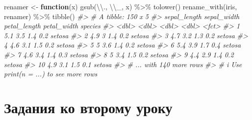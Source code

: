 \documentclass[
]{book}
\newenvironment{Shaded}{\begin{snugshade}}{\end{snugshade}}
\newcommand{\CommentTok}[1]{\textcolor[rgb]{0.56,0.35,0.01}{\textit{#1}}}
\newcommand{\ControlFlowTok}[1]{\textcolor[rgb]{0.13,0.29,0.53}{\textbf{#1}}}
\newcommand{\FunctionTok}[1]{\textcolor[rgb]{0.00,0.00,0.00}{#1}}
\newcommand{\NormalTok}[1]{#1}
\newcommand{\OtherTok}[1]{\textcolor[rgb]{0.56,0.35,0.01}{#1}}
\newcommand{\SpecialCharTok}[1]{\textcolor[rgb]{0.00,0.00,0.00}{#1}}
\newcommand{\StringTok}[1]{\textcolor[rgb]{0.31,0.60,0.02}{#1}}
\begin{document}
\begin{Shaded}
\begin{Highlighting}[]
\NormalTok{renamer }\OtherTok{\textless{}{-}} \ControlFlowTok{function}\NormalTok{(x) }\FunctionTok{gsub}\NormalTok{(}\StringTok{\textquotesingle{}}\SpecialCharTok{\textbackslash{}\textbackslash{}}\StringTok{.\textquotesingle{}}\NormalTok{, }\StringTok{\textquotesingle{}}\SpecialCharTok{\textbackslash{}\textbackslash{}}\StringTok{\_\textquotesingle{}}\NormalTok{, x) }\SpecialCharTok{\%\textgreater{}\%} \FunctionTok{tolower}\NormalTok{()}
\FunctionTok{rename\_with}\NormalTok{(iris, renamer) }\SpecialCharTok{\%\textgreater{}\%} 
  \FunctionTok{tibble}\NormalTok{()}
\CommentTok{\#\textgreater{} \# A tibble: 150 x 5}
\CommentTok{\#\textgreater{}    sepal\_length sepal\_width petal\_length petal\_width species}
\CommentTok{\#\textgreater{}           \textless{}dbl\textgreater{}       \textless{}dbl\textgreater{}        \textless{}dbl\textgreater{}       \textless{}dbl\textgreater{} \textless{}fct\textgreater{}  }
\CommentTok{\#\textgreater{}  1          5.1         3.5          1.4         0.2 setosa }
\CommentTok{\#\textgreater{}  2          4.9         3            1.4         0.2 setosa }
\CommentTok{\#\textgreater{}  3          4.7         3.2          1.3         0.2 setosa }
\CommentTok{\#\textgreater{}  4          4.6         3.1          1.5         0.2 setosa }
\CommentTok{\#\textgreater{}  5          5           3.6          1.4         0.2 setosa }
\CommentTok{\#\textgreater{}  6          5.4         3.9          1.7         0.4 setosa }
\CommentTok{\#\textgreater{}  7          4.6         3.4          1.4         0.3 setosa }
\CommentTok{\#\textgreater{}  8          5           3.4          1.5         0.2 setosa }
\CommentTok{\#\textgreater{}  9          4.4         2.9          1.4         0.2 setosa }
\CommentTok{\#\textgreater{} 10          4.9         3.1          1.5         0.1 setosa }
\CommentTok{\#\textgreater{} \# ... with 140 more rows}
\CommentTok{\#\textgreater{} \# i Use \textasciigrave{}print(n = ...)\textasciigrave{} to see more rows}
\end{Highlighting}
\end{Shaded}

\hypertarget{ux437ux430ux434ux430ux43dux438ux44f-ux43aux43e-ux432ux442ux43eux440ux43eux43cux443-ux443ux440ux43eux43aux443}{%
\section*{Задания ко второму уроку}\label{ux437ux430ux434ux430ux43dux438ux44f-ux43aux43e-ux432ux442ux43eux440ux43eux43cux443-ux443ux440ux43eux43aux443}}
\end{document}

